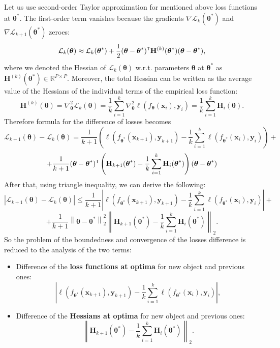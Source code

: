 \documentclass{article}
\begin{document}
Let us use second-order Taylor approximation for mentioned above loss functions at $\boldsymbol{\theta}^*$. The first-order term vanishes because the gradients $\nabla \mathcal{L}_{k}(\boldsymbol{\theta}^*)$ and $\nabla \mathcal{L}_{k+1}(\boldsymbol{\theta}^*)$ zeroes:
\[ \mathcal{L}_{k}(\boldsymbol{\theta}) \approx \mathcal{L}_{k}(\boldsymbol{\theta}^*) + \dfrac{1}{2} (\boldsymbol{\theta} - \boldsymbol{\theta}^*)\T \mathbf{H}^{(k)}(\boldsymbol{\theta}^*) (\boldsymbol{\theta} - \boldsymbol{\theta}^*), \]
where we denoted the Hessian of $\mathcal{L}_{k}(\boldsymbol{\theta})$ w.r.t. parameters $\boldsymbol{\theta}$ at $\boldsymbol{\theta}^*$ as $\mathbf{H}^{(k)}(\boldsymbol{\theta}^*) \in \mathbb{R}^{P \times P}$. Moreover, the total Hessian can be written as the average value of the Hessians of the individual terms of the empirical loss function:
\[ \mathbf{H}^{(k)}(\boldsymbol{\theta}) = \nabla^2_{\boldsymbol{\theta}} \mathcal{L}_{k}(\boldsymbol{\theta}) = \dfrac{1}{k} \sum\limits_{i=1}^{k} \nabla^2_{\boldsymbol{\theta}} \ell(f_{\boldsymbol{\theta}}(\mathbf{x}_{i}), \mathbf{y}_{i}) = \dfrac{1}{k} \sum\limits_{i=1}^{k} \mathbf{H}_{i}(\boldsymbol{\theta}). \]
Therefore formula for the difference of losses becomes
\[ \mathcal{L}_{k+1}(\boldsymbol{\theta}) - \mathcal{L}_k(\boldsymbol{\theta}) = \dfrac{1}{k+1} \left( \ell(f_{\boldsymbol{\theta}^*}(\mathbf{x}_{k+1}), \mathbf{y}_{k+1}) - \dfrac{1}{k} \sum\limits_{i=1}^{k} \ell(f_{\boldsymbol{\theta}^*}(\mathbf{x}_{i}), \mathbf{y}_{i}) \right) + \]
\[ + \dfrac{1}{k+1} (\boldsymbol{\theta} - \boldsymbol{\theta}^*)\T \left( \mathbf{H}_{k+1}(\boldsymbol{\theta}^*) - \dfrac{1}{k} \sum\limits_{i=1}^{k} \mathbf{H}_{i}(\boldsymbol{\theta}^*) \right) (\boldsymbol{\theta} - \boldsymbol{\theta}^*) \]
After that, using triangle inequality, we can derive the following:
\[ \left| \mathcal{L}_{k+1}(\boldsymbol{\theta}) - \mathcal{L}_k(\boldsymbol{\theta}) \right| \leqslant \dfrac{1}{k+1} \left| \ell(f_{\boldsymbol{\theta}^*}(\mathbf{x}_{k+1}), \mathbf{y}_{k+1}) - \dfrac{1}{k} \sum\limits_{i=1}^{k} \ell(f_{\boldsymbol{\theta}^*}(\mathbf{x}_{i}), \mathbf{y}_{i}) \right| + \]
\[ + \dfrac{1}{k+1} \left\|\boldsymbol{\theta} - \boldsymbol{\theta}^*\right\|_2^2 \left\| \mathbf{H}_{k+1}(\boldsymbol{\theta}^*) - \dfrac{1}{k} \sum\limits_{i=1}^{k} \mathbf{H}_{i}(\boldsymbol{\theta}^*) \right\|_2. \]
So the problem of the boundedness and convergence of the losses difference is reduced to the analysis of the two terms:
\begin{itemize}
    \item Difference of the \textbf{loss functions at optima} for new object and previous ones:
    \[ \left| \ell(f_{\boldsymbol{\theta}^*}(\mathbf{x}_{k+1}), \mathbf{y}_{k+1}) - \dfrac{1}{k} \sum\limits_{i=1}^{k} \ell(f_{\boldsymbol{\theta}^*}(\mathbf{x}_{i}), \mathbf{y}_{i}) \right|, \]
    \item Difference of the \textbf{Hessians at optima} for new object and previous ones:
    \[ \left\| \mathbf{H}_{k+1}(\boldsymbol{\theta}^*) - \dfrac{1}{k} \sum\limits_{i=1}^{k} \mathbf{H}_{i}(\boldsymbol{\theta}^*) \right\|_2. \]
\end{itemize}
\end{document}
